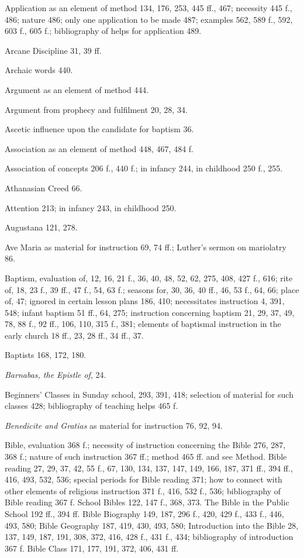 Application as an element of method 134, 176, 253, 445 ff., 467; necessity 445 f., 486; nature 486; only one application to be made 487; examples 562, 589 f., 592, 603 f., 605 f.; bibliography of helps for application 489.

Arcane Discipline 31, 39 ff.

Archaic words 440.

Argument as an element of method 444.

Argument from prophecy and fulfilment 20, 28, 34.

Ascetic influence upon the candidate for baptism 36.

Association as an element of method 448, 467, 484 f.

Association of concepts 206 f., 440 f.; in infancy 244, in childhood 250 f., 255.

Athanasian Creed 66.

Attention 213; in infancy 243, in childhood 250.

Augustana 121, 278.

Ave Maria as material for instruction 69, 74 ff.; Luther’s sermon on mariolatry 86.

Baptism, evaluation of, 12, 16, 21 f., 36, 40, 48, 52, 62, 275, 408, 427 f., 616; rite of, 18, 23 f., 39 ff., 47 f., 54, 63 f.; seasons for, 30, 36, 40 ff., 46, 53 f., 64, 66; place of, 47; ignored in certain lesson plans 186, 410; necessitates instruction 4, 391, 548; infant baptism 51 ff., 64, 275; instruction concerning baptism 21, 29, 37, 49, 78, 88 f., 92 ff., 106, 110, 315 f., 381; elements of baptismal instruction in the early church 18 ff., 23, 28 ff., 34 ff., 37.

Baptists 168, 172, 180.

\emph{Barnabas, the Epistle of}, 24.

Beginners’ Classes in Sunday school, 293, 391, 418; selection of material for such classes 428; bibliography of teaching helps 465 f.

\emph{Benedicite and Gratias} as material for instruction 76, 92, 94.

Bible, evaluation 368 f.; necessity of instruction concerning the Bible 276, 287, 368 f.; nature of such instruction 367 ff.; method 465 ff. and see Method. Bible reading 27, 29, 37, 42, 55 f., 67, 130, 134, 137, 147, 149, 166, 187, 371 ff., 394 ff., 416, 493, 532, 536; special periods for Bible reading 371; how to connect with other elements of religious instruction 371 f., 416, 532 f., 536; bibliography of Bible reading 367 f. School Bibles 122, 147 f., 368, 373. The Bible in the Public School 192 ff., 394 ff. Bible Biography 149, 187, 296 f., 420, 429 f., 433 f., 446, 493, 580; Bible Geography 187, 419, 430, 493, 580; Introduction into the Bible 28, 137, 149, 187, 191, 308, 372, 416, 428 f., 431 f., 434; bibliography of introduction 367 f. Bible Class 171, 177, 191, 372, 406, 431 ff.


